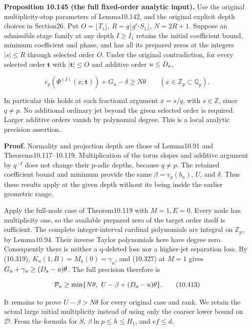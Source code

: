 \documentclass[
  11pt,
  a4paper,
]{article}
\begin{document}
\textbf{Proposition 10.145 (the full fixed-order analytic input).} Use
the original multiplicity-stop parameters of Lemma10.142, and the
original explicit depth choices in Section26. Put
\(O=\lfloor T_\flat\rfloor\), \(R=q\lfloor q^{r_1}S_1\rfloor\),
\(N=2R+1\). Suppose an admissible stage family at any depth \(I\ge I_1\)
retains the initial coefficient bound, minimum coefficient and phase,
and has all its prepared zeros at the integers \(|s|\le R\) through
selected order \(O\). Under the original contradiction, for every
selected order \(\boldsymbol t\) with \(|\boldsymbol t|\le O\) and
additive order \(u\le D_{\rm a}\),

\[
v_p(\Phi^{(I)}(x;\boldsymbol t))+G_u-\delta\ge N\theta
\qquad(x\in\mathbb Z_p\subset\mathbb Q_p).
\tag{10.412}
\]

In particular this holds at each fractional argument \(x=s/q\), with
\(s\in\mathbb Z\), since \(q\ne p\). No additional ordinary jet beyond
the given selected order is required. Larger additive orders vanish by
polynomial degree. This is a local analytic precision assertion.

\textbf{Proof.} Normality and projection depth are those of Lemma10.91
and Theorems10.117--10.119. Multiplication of the torus slopes and
additive argument by \(q^{-I}\) does not change their p-adic depths,
because \(q\ne p\). The retained coefficient bound and minimum provide
the same \(\beta=v_p(b_n)\), \(U\), and \(\delta\). Thus these results
apply at the given depth without its being inside the earlier geometric
range.

Apply the full-node case of Theorem10.119 with \(M=1,E=0\). Every node
has multiplicity one, so the available prepared zero of the target order
itself is sufficient. The complete integer-interval cardinal polynomials
are integral on \(\mathbb Z_p\), by Lemma10.94. Their inverse Taylor
polynomials here have degree zero. Consequently there is neither a
q-deleted loss nor a higher-jet separation loss. By (10.319),
\(K_u(1,B)=M_u(0)=\gamma_u\), and (10.327) at \(M=1\) gives
\(G_u+\gamma_u\ge(D_{\rm a}-u)\theta\). The full precision therefore is

\[
\mathcal P_u\ge
\min\{N\theta,\ U-\beta+(D_{\rm a}-u)\theta\}.
\tag{10.413}
\]

It remains to prove \(U-\beta>N\theta\) for every original case and
rank. We retain the actual large initial multiplicity instead of using
only the coarser lower bound on \(\mathcal D\). From the formula for
\(S\), \(\beta\ln p\le h\le H_1\), and \(ef\le d\),
\end{document}
